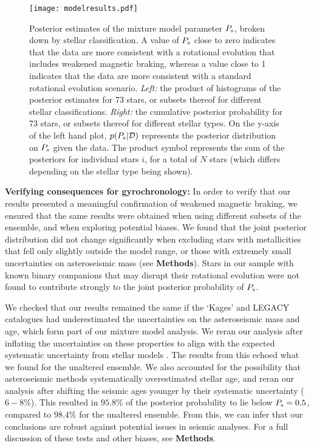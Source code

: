 \documentclass[12pt]{article}
\begin{document}
\begin{figure}
	\centering
	\texttt{[image: modelresults.pdf]}
	\caption{Posterior estimates of the mixture model parameter $P_{\rm s}$, broken down by stellar classification. A value of $P_{\rm s}$ close to zero indicates that the data are more consistent with a rotational evolution that includes weakened magnetic braking, whereas a value close to 1 indicates that the data are more consistent with a standard rotational evolution scenario. \textit{Left:} the product of histograms of the posterior estimates for 73 stars, or subsets thereof for different stellar classifications. \textit{Right:} the cumulative posterior probability for 73 stars, or subsets thereof for different stellar types. On the y-axis of the left hand plot, $p(P_{\rm s} | \mathcal{D})$ represents the posterior distribution on $P_{\rm s}$ given the data. The product symbol represents the sum of the posteriors for individual stars $i$, for a total of $N$ stars (which differs depending on the stellar type being shown).}
	\label{fig:gyroresults}
\end{figure}

\textbf{Verifying consequences for gyrochronology:} In order to verify that our results presented a meaningful confirmation of weakened magnetic braking, we ensured that the same results were obtained when using different subsets of the ensemble, and when exploring potential biases. We found that the joint posterior distribution did not change significantly when excluding stars with metallicities that fell only slightly outside the model range, or those with extremely small uncertainties on asteroseismic mass (see \textbf{Methods}). Stars in our sample with known binary companions that may disrupt their rotational evolution were not found to contribute strongly to the joint posterior probability of $P_{\rm s}$. 

We checked that our results remained the same if the `Kages' and LEGACY catalogues had underestimated the uncertainties on the asteroseismic mass and age, which form part of our mixture model analysis. We reran our analysis after inflating the uncertainties on these properties to align with the expected systematic uncertainty from stellar models \cite{silvaaguirre+2015,silvaaguirre+2017}. The results from this echoed what we found for the unaltered ensemble. We also accounted for the possibility that asteroseismic methods systematically overestimated stellar age, and reran our analysis after shifting the seismic ages younger by their systematic uncertainty ($6-8\%$). This resulted in $95.8\%$ of the posterior probability to lie below $P_{\rm s} = 0.5$, compared to $98.4\%$ for the unaltered ensemble. From this, we can infer that our conclusions are robust against potential issues in seismic analyses. For a full discussion of these tests and other biases, see \textbf{Methods}.\\
\end{document}
